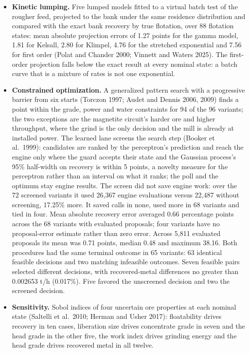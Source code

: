 \documentclass[10pt]{article}
\providecommand{\tightlist}{\setlength{\itemsep}{0pt}\setlength{\parskip}{0pt}}
\begin{document}
\begin{itemize}
\tightlist
\item
  \textbf{Kinetic lumping.} Five lumped models fitted to a virtual batch
  test of the rougher feed, projected to the bank under the same
  residence distribution and compared with the exact bank recovery by
  true flotation, over 88 flotation states: mean absolute projection
  errors of 1.27 points for the gamma model, 1.81 for Kelsall, 2.80 for
  Klimpel, 4.76 for the stretched exponential and 7.56 for first order
  (Polat and Chander 2000; Vinnett and Waters 2025). The first-order
  projection falls below the exact result at every nominal state: a
  batch curve that is a mixture of rates is not one exponential.
\item
  \textbf{Constrained optimization.} A generalized pattern search with a
  progressive barrier from six starts (Torczon 1997; Audet and Dennis
  2006, 2009) finds a point within the grade, power and water
  constraints for 94 of the 96 variants; the two exceptions are the
  magnetite circuit's harder ore and higher throughput, where the grind
  is the only decision and the mill is already at installed power. The
  learned lane screens the search step (Booker et al.~1999): candidates
  are ranked by the perceptron's prediction and reach the engine only
  where the guard accepts their state and the Gaussian process's 95\%
  half-width on recovery is within 5 points, a novelty measure for the
  perceptron rather than an interval on what it ranks; the poll and the
  optimum stay engine results. The screen did not save engine work: over
  the 72 screened variants it used 26,367 engine evaluations versus
  22,487 without screening, 17.25\% more. It saved calls in none, used
  more in 68 variants and tied in four. Mean absolute recovery error
  averaged 0.66 percentage points across the 68 variants with evaluated
  proposals; four variants have no proposal-error estimate rather than
  zero error. Across 5,811 evaluated proposals its mean was 0.71 points,
  median 0.48 and maximum 38.16. Both procedures had the same terminal
  outcome in 65 variants: 63 identical feasible decisions and two
  matching infeasible outcomes. Seven feasible pairs selected different
  decisions, with recovered-metal differences no greater than 0.002653
  t/h (0.017\%). Five favored the unscreened decision and two the
  screened decision.
\item
  \textbf{Sensitivity.} Sobol indices of four uncertain ore properties
  at each nominal state (Saltelli et al.~2010; Herman and Usher 2017):
  floatability drives recovery in ten cases, liberation size drives
  concentrate grade in seven and the head grade in the other five, the
  work index drives grinding energy and the head grade drives recovered
  metal in all twelve.
\end{itemize}
\end{document}
